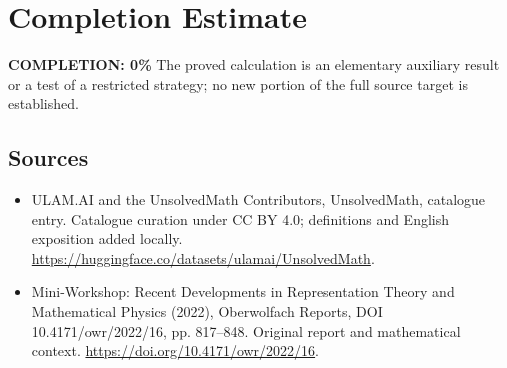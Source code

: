 \documentclass[11pt]{article}
\begin{document}
\section{Completion Estimate}
\noindent\textbf{COMPLETION: 0\%}
The proved calculation is an elementary auxiliary result or a test of a restricted strategy; no new portion of the full source target is established.

\subsection{Sources}
\begin{itemize}
\item[\hypertarget{source:statement:1}{S1}] ULAM.AI and the UnsolvedMath Contributors, UnsolvedMath, catalogue entry. Catalogue curation under CC BY 4.0; definitions and English exposition added locally.
\url{https://huggingface.co/datasets/ulamai/UnsolvedMath}.
\item[\hypertarget{source:statement:2}{S2}] Mini-Workshop: Recent Developments in Representation Theory and Mathematical Physics (2022), Oberwolfach Reports, DOI 10.4171/owr/2022/16, pp. 817--848. Original report and mathematical context.
\url{https://doi.org/10.4171/owr/2022/16}.
\end{itemize}
\label{end:statement}
\end{document}
